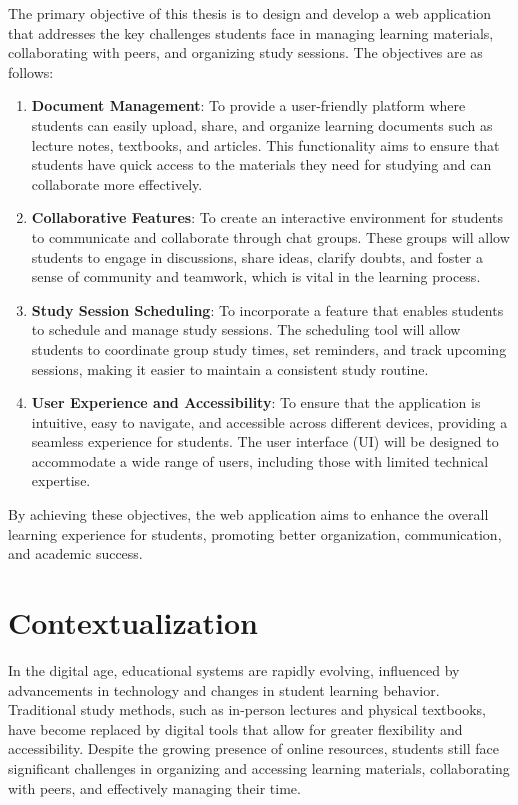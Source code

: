 The primary objective of this thesis is to design and develop a web application that addresses the key challenges students face in managing learning materials, collaborating with peers, and organizing study sessions. The objectives are as follows:

\begin{enumerate}
    \item \textbf{Document Management}: To provide a user-friendly platform where students can easily upload, share, and organize learning documents such as lecture notes, textbooks, and articles. This functionality aims to ensure that students have quick access to the materials they need for studying and can collaborate more effectively.
    \item \textbf{Collaborative Features}: To create an interactive environment for students to communicate and collaborate through chat groups. These groups will allow students to engage in discussions, share ideas, clarify doubts, and foster a sense of community and teamwork, which is vital in the learning process.
    \item \textbf{Study Session Scheduling}: To incorporate a feature that enables students to schedule and manage study sessions. The scheduling tool will allow students to coordinate group study times, set reminders, and track upcoming sessions, making it easier to maintain a consistent study routine.
    \item \textbf{User Experience and Accessibility}: To ensure that the application is intuitive, easy to navigate, and accessible across different devices, providing a seamless experience for students. The user interface (UI) will be designed to accommodate a wide range of users, including those with limited technical expertise.
\end{enumerate}

By achieving these objectives, the web application aims to enhance the overall learning experience for students, promoting better organization, communication, and academic success.

\section{Contextualization}

In the digital age, educational systems are rapidly evolving, influenced by advancements in technology and changes in student learning behavior. Traditional study methods, such as in-person lectures and physical textbooks, have become replaced by digital tools that allow for greater flexibility and accessibility. Despite the growing presence of online resources, students still face significant challenges in organizing and accessing learning materials, collaborating with peers, and effectively managing their time.

